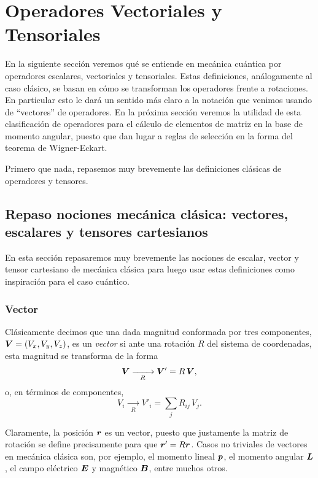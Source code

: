 \documentclass[10pt, a4paper]{article}
\numberwithin{equation}{subsection}
\begin{document}
\section{Operadores Vectoriales y Tensoriales}

En la siguiente sección veremos qué se entiende en mecánica cuántica por
operadores escalares, vectoriales y tensoriales. Estas definiciones,
análogamente al caso clásico, se basan en cómo se transforman los operadores
frente a rotaciones. En particular esto le dará un sentido más claro a la
notación que venimos usando de ``vectores'' de operadores. En la próxima
sección veremos la utilidad de esta clasificación de operadores para el cálculo
de elementos de matriz en la base de momento angular, puesto que dan lugar a
reglas de selección en la forma del teorema de Wigner-Eckart.

Primero que nada, repasemos muy brevemente las definiciones clásicas de
operadores y tensores.

\subsection{Repaso nociones mecánica clásica: vectores, escalares y tensores
  cartesianos}

En esta sección repasaremos muy brevemente las nociones de escalar, vector y
tensor cartesiano de mecánica clásica para luego usar estas definiciones como
inspiración para el caso cuántico.

\subsubsection{Vector}
Clásicamente decimos que una dada magnitud conformada por tres componentes,
$\vb*{V} = (V_x, V_y, V_z)$, es un \emph{vector} si ante una rotación $R$ del
sistema de coordenadas, esta magnitud se transforma de la forma
\begin{equation}
  \vb*{V} \xrightarrow[R]{\qquad} \vb*{V}' = R\,\vb*{V},
\end{equation}
o, en términos de componentes,
\begin{equation}
  V_i \xrightarrow[R]{\qquad} {V'}_i = \sum_j R_{ij}\,V_j.
\end{equation}

Claramente, la posición $\vb*{r}$ es un vector, puesto que justamente la
matriz de rotación se define precisamente para que $\vb*{r}' = R\vb*{r}$.
Casos no triviales de vectores en mecánica clásica son, por ejemplo, el momento
lineal $\vb*{p}$, el momento angular $\vb*{L}$, el campo eléctrico $\vb*{E}$
y magnético $\vb*{B}$, entre muchos otros.
\end{document}
